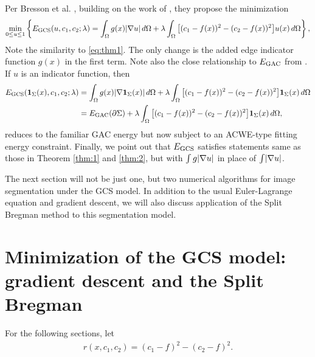 Per Bresson et al. \cite{bresson2007fast}, building on the work of \cite{chan2006algorithms}, they propose the minimization 
\begin{align}
\min_{0\leq u \leq 1} \left\{
E_\textrm{GCS}(u, c_1, c_2; \lambda) 
= 
\int_{\Omega} g(x)  \lvert\nabla u\rvert \,d\Omega 
+ \lambda\int_{\Omega} \big[ (c_1 - f(x) )^2 - (c_2 - f(x))^2 \big] u(x) \,d\Omega
\right\},
\end{align}
Note the similarity to \eqref{eq:thm1}. The only change is the added edge indicator function $g(x)$ in the first term. Note also the close relationship to $E_\textrm{GAC}$ from . If $u$ is an indicator function, then 
\begin{align*}
E_\textrm{GCS}(\mathbf{1}_\Sigma(x), c_1, c_2; \lambda) 
&= \int_{\Omega} g(x)  \lvert\nabla \mathbf{1}_\Sigma(x)\rvert \,d\Omega 
+ \lambda\int_{\Omega} \big[ (c_1 - f(x) )^2 - (c_2 - f(x))^2 \big] \mathbf{1}_\Sigma(x) \,d\Omega
\\
&= E_\textrm{GAC}(\partial \Sigma) +  \lambda\int_{\Omega} \big[ (c_1 - f(x) )^2 - (c_2 - f(x))^2 \big] \mathbf{1}_\Sigma(x) \,d\Omega,
\end{align*}
reduces to the familiar GAC energy but now subject to an ACWE-type fitting energy constraint. Finally, we point out that $E_\textrm{GCS}$ satisfies statements same as those in Theorem \ref{thm:1} and \ref{thm:2}, but with $\int g\lvert\nabla u\rvert$ in place of $\int \lvert\nabla u\rvert$.

The next section will not be just one, but two numerical algorithms for image segmentation under the GCS model. In addition to the usual Euler-Lagrange equation and gradient descent, we will also discuss application of the Split Bregman method \cite{goldstein2010geometric,goldstein2009split} to this segmentation model.

\section{Minimization of the GCS model: gradient descent and the Split Bregman}
For the following sections, let 
\begin{align*}
r(x, c_1, c_2) = (c_1 - f)^2 - (c_2 - f)^2.
\end{align*}

